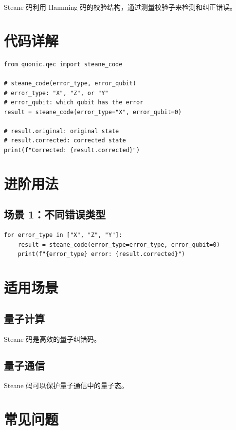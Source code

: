\documentclass[12pt,a4paper]{article}
\begin{document}
Steane 码利用 Hamming 码的校验结构，通过测量校验子来检测和纠正错误。

\section{代码详解}

\begin{lstlisting}[style=python]
from quonic.qec import steane_code

# steane_code(error_type, error_qubit)
# error_type: "X", "Z", or "Y"
# error_qubit: which qubit has the error
result = steane_code(error_type="X", error_qubit=0)

# result.original: original state
# result.corrected: corrected state
print(f"Corrected: {result.corrected}")
\end{lstlisting}

\section{进阶用法}

\subsection{场景 1：不同错误类型}

\begin{lstlisting}[style=python]
for error_type in ["X", "Z", "Y"]:
    result = steane_code(error_type=error_type, error_qubit=0)
    print(f"{error_type} error: {result.corrected}")
\end{lstlisting}

\section{适用场景}

\subsection{量子计算}

Steane 码是高效的量子纠错码。

\subsection{量子通信}

Steane 码可以保护量子通信中的量子态。

\section{常见问题}
\end{document}

